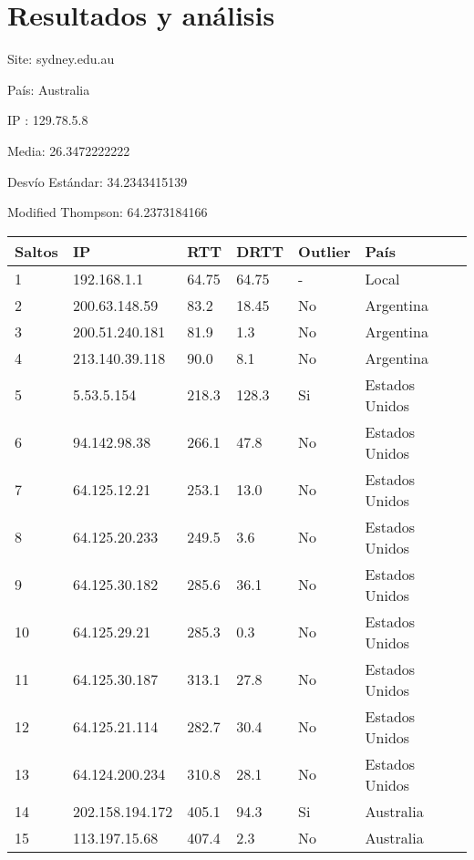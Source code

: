 \section{Resultados y análisis}

Site: sydney.edu.au

País: Australia

IP : 129.78.5.8

Media: 26.3472222222 

Desvío Estándar: 34.2343415139 

Modified Thompson: 64.2373184166

\begin{center}
    \begin{tabular}{| l | l | l | l | l | l | }
    \hline
    Saltos & IP             & RTT    & DRTT   & Outlier & País       \\ \hline
    1    &    192.168.1.1     & 64.75 &  64.75 & -  & Local          \\ \hline 
    2    &    200.63.148.59   & 83.2  &  18.45 & No & Argentina      \\ \hline
    3    &    200.51.240.181  & 81.9  &  1.3   & No & Argentina      \\ \hline
    4    &    213.140.39.118  & 90.0  &  8.1   & No & Argentina      \\ \hline
    5    &    5.53.5.154      & 218.3 &  128.3 & Si & Estados Unidos \\ \hline
    6    &    94.142.98.38    & 266.1 &  47.8  & No & Estados Unidos \\ \hline
    7    &    64.125.12.21    & 253.1 &  13.0  & No & Estados Unidos \\ \hline
    8    &    64.125.20.233   & 249.5 &  3.6   & No & Estados Unidos \\ \hline
    9    &    64.125.30.182   & 285.6 &  36.1  & No & Estados Unidos \\ \hline
    10   &    64.125.29.21    & 285.3 &  0.3   & No & Estados Unidos \\ \hline
    11   &    64.125.30.187   & 313.1 &  27.8  & No & Estados Unidos \\ \hline
    12   &    64.125.21.114   & 282.7 &  30.4  & No & Estados Unidos \\ \hline
    13   &    64.124.200.234  & 310.8 &  28.1  & No & Estados Unidos \\ \hline
    14   &    202.158.194.172 & 405.1 &  94.3  & Si & Australia      \\ \hline
    15   &    113.197.15.68   & 407.4 &  2.3   & No & Australia      \\ \hline

\end{tabular}
\end{center}
